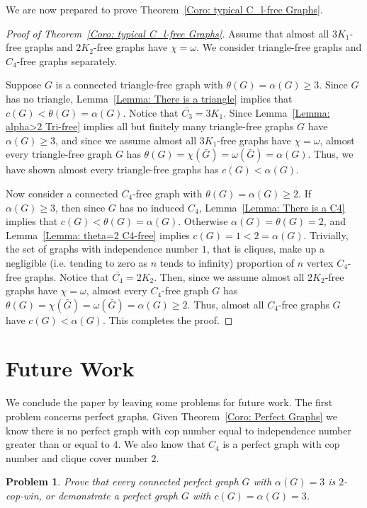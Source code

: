 \documentclass[12pt]{amsart}
\newtheorem{problem}[theorem]{Problem}
\theoremstyle{definition}
\begin{document}
We are now prepared to prove Theorem~\ref{Coro: typical C_l-free Graphs}.
\begin{proof}[Proof of Theorem~\ref{Coro: typical C_l-free Graphs}]
Assume that almost all $3K_1$-free graphs and $2K_2$-free graphs have $\chi = \omega$.
We consider triangle-free graphs and $C_4$-free graphs separately.

Suppose $G$ is a connected triangle-free graph with $\theta(G) = \alpha(G) \geq 3$.
Since $G$ has no triangle, Lemma~\ref{Lemma: There is a triangle} implies that $c(G) < \theta(G) = \alpha(G)$.
Notice that $\bar{C_3} = 3K_1$.
Since Lemma~\ref{Lemma: alpha>2 Tri-free} implies all but finitely many triangle-free graphs $G$ have $\alpha(G)\geq 3$,
and since we assume almost all $3K_1$-free graphs have $\chi = \omega$, 
almost every triangle-free graph $G$ has $\theta(G) = \chi(\bar{G}) = \omega(\bar{G}) = \alpha(G)$.
Thus,
we have shown almost every triangle-free graphs has $c(G) < \alpha(G)$.

Now consider a connected $C_4$-free graph with $\theta(G) = \alpha(G) \geq 2$.
If $\alpha(G)\geq 3$, then since $G$ has no induced $C_4$, Lemma~\ref{Lemma: There is a C4} implies that $c(G) < \theta(G) = \alpha(G)$.
Otherwise $\alpha(G) = \theta(G) = 2$, and Lemma~\ref{Lemma: theta=2 C4-free} implies $c(G) = 1 < 2 = \alpha(G)$.
Trivially, the set of graphs with independence number $1$, that is cliques, make up a negligible (i.e. tending to zero as $n$ tends to infinity) proportion of $n$ vertex $C_4$-free graphs.
Notice that $\bar{C_4} = 2K_2$.
Then, since we assume almost all $2K_2$-free graphs have $\chi = \omega$, 
almost every $C_4$-free graph $G$ has $\theta(G) = \chi(\bar{G}) = \omega(\bar{G}) = \alpha(G)\geq 2$.
Thus, almost all $C_4$-free graphs $G$ have $c(G) < \alpha(G)$.
This completes the proof.
\end{proof}




\section{Future Work}

We conclude the paper by leaving some problems for future work.
The first problem concerns perfect graphs.
Given Theorem~\ref{Coro: Perfect Graphs}
we know there is no perfect graph with cop number equal to independence number greater than or equal to $4$.
We also know that 
$C_4$ is a perfect graph with cop number and clique cover number $2$.


\begin{problem}
    Prove that every connected perfect graph $G$ with $\alpha(G) = 3$
    is $2$-cop-win, or demonstrate a perfect graph $G$ with $c(G) = \alpha(G) = 3$.
\end{problem}
\end{document}
